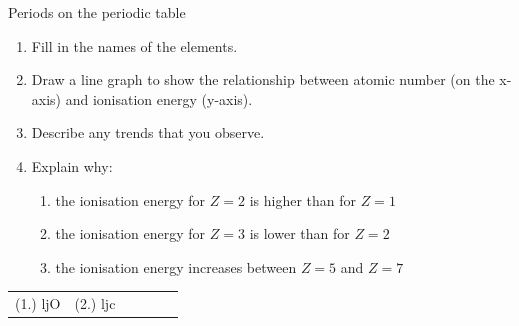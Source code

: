 \begin{exercises}{Periods on the periodic table}
\begin{enumerate}[noitemsep, label=\textbf{\arabic*}. ]
\begin{enumerate}[noitemsep, label=\textbf{\alph*}. ]
 \item Fill in the names of the elements.
\item Draw a line graph to show the relationship between atomic number (on the x-axis) and ionisation energy (y-axis).
\item Describe any trends that you observe.
\item Explain why:
	\begin{enumerate}[noitemsep, label=\textbf{\roman*}. ]
	\item the ionisation energy for $Z=2$ is higher than for $Z=1$
	\item the ionisation energy for $Z=3$ is lower than for $Z=2$
	\item the ionisation energy increases between $Z=5$ and $Z=7$
	\end{enumerate}

\end{enumerate}
\end{enumerate}
      \label{m38757*secfhsst!!!underscore!!!id936}
\practiceinfo
\par 
 \par \begin{tabular}[h]{cccccc}
 (1.) ljO  & (2.) ljc \end{tabular}
\end{exercises}
